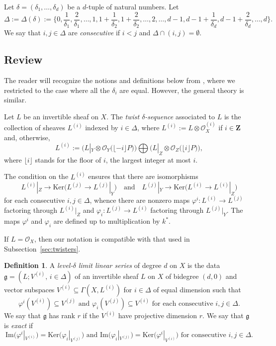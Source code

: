 \documentclass[a4paper,11pt]{amsart}
\theoremstyle{plain}
\theoremstyle{definition}
\newtheorem{defn}[thm]{Definition}
\theoremstyle{remark}
\def\O{\mathcal{O}}
\def\ox{\otimes}
\begin{document}
Let $\delta=(\delta_1,\dots,\delta_d)$ be a $d$-tuple of natural numbers. Let 
$$
\Delta:=\Delta(\delta):=\Big\{0,\frac{1}{\delta_1},\frac{2}{\delta_1},\dots,1,
1+\frac{1}{\delta_2},1+\frac{2}{\delta_2},\dots,2,\dots,d-1,
d-1+\frac{1}{\delta_d},d-1+\frac{2}{\delta_d},\dots,d\Big\}.
$$
We say that $i,j\in\Delta$ are \emph{consecutive} if $i<j$ and $\Delta\cap(i,j)=\emptyset$.

\subsection{Review}

The reader will recognize the notions and definitions below from \cite{ENR}, where we restricted to the case where all the $\delta_i$ are equal. However, the general theory is similar.

Let $L$ be an invertible sheaf on $X$. The \emph{twist $\delta$-sequence} associated to $L$ is the collection of sheaves
$L^{(i)}$ indexed by
$i\in\Delta$, where
$L^{(i)}:=L\otimes\mathcal O_X^{(i)}$ if $i\in\mathbf Z$ and, otherwise,
\begin{equation}\label{Linot}
L^{(i)}:=\Big(L|_Y\ox\O_Y\big(\lfloor-i\rfloor P\big)\Big)\bigoplus\Big(L|_Z\ox\O_Z\big(\lfloor i\rfloor P\big)\Big),
\end{equation}
where $\lfloor i\rfloor$ stands for the floor of $i$, the largest integer at most $i$.

The condition on the $L^{(i)}$ ensures that there are isomorphisms
$$
L^{(i)}|_Z\longrightarrow\text{Ker}\big(L^{(j)}\to L^{(j)}|_Y\big)\quad\text{and}\quad
L^{(j)}|_Y\longrightarrow\text{Ker}\big(L^{(i)}\to L^{(i)}|_Z\big)
$$
for each consecutive $i,j\in\Delta$, whence there are nonzero maps $\varphi^i\colon L^{(i)}\to L^{(j)}$ factoring through $L^{(i)}|_Z$ and $\varphi_i\colon L^{(j)}\to L^{(i)}$ factoring through $L^{(j)}|_Y$. The 
maps $\varphi^i$ and $\varphi_i$ are defined up to multiplication by $k^*$. 

If $L=\mathcal O_X$, then our notation is compatible with that used in Subsection~\ref{sec:twisters}. 

\begin{defn} 
A {\it level-$\delta$ limit linear series} of degree $d$ on $X$ is
the data $\mathfrak g=(L;V^{(i)},\,i\in\Delta)$ of an
invertible sheaf $L$ on $X$ of bidegree $(d,0)$ and vector subspaces
$V^{(i)}\subseteq\Gamma(X,L^{(i)})$ for $i\in\Delta$
of equal dimension such that
\begin{equation}\label{compatible}
\varphi^i(V^{(i)})\subseteq
V^{(j)}\text{\ and\ }
\varphi_i(V^{(j)})\subseteq
V^{(i)}\text{\ for each consecutive }i,j\in\Delta.
\end{equation}
We say that $\mathfrak g$ has rank $r$
if the $V^{(i)}$ have projective dimension $r$. We say that
$\mathfrak g$ is \emph{exact} if 
\begin{equation}\label{exact}
\text{Im}\big(\varphi^i|_{V^{(i)}}\big)=
\text{Ker}\big(\varphi_i|_{V^{(j)}}\big)
\text{\ and\ }
\text{Im}\big(\varphi_i|_{V^{(j)}}\big)=
\text{Ker}\big(\varphi^i|_{V^{(i)}}\big)\text{\ for consecutive }i,j\in\Delta.
\end{equation}
\end{defn}
\end{document}

